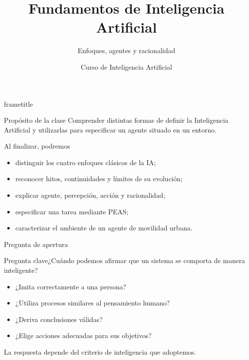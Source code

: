 \documentclass[aspectratio=169,11pt]{beamer}
\title[IA · Clase 1]{Fundamentos de Inteligencia Artificial}
\subtitle{Enfoques, agentes y racionalidad}
\author{Curso de Inteligencia Artificial}
\institute{Semana 1 · Clase 1}
\date{}
\newcommand{\pregunta}[1]{\begin{block}{Pregunta clave}#1\end{block}}
\begin{document}
\begin{frame}[plain]
  \begin{beamercolorbox}[wd=\paperwidth,ht=\paperheight,sep=2em]{frametitle}
    \vfill
    {\Huge\inserttitle\par}
    \vspace{0.5em}
    {\Large\insertsubtitle\par}
    \vspace{2em}
    {\color{white}\large\insertauthor\par}
    {\color{white}\insertinstitute\par}
    \vfill
  \end{beamercolorbox}
\end{frame}

\begin{frame}{Propósito de la clase}
  Comprender distintas formas de definir la Inteligencia Artificial y utilizarlas para especificar un agente situado en un entorno.
  \vspace{0.5em}
  \begin{block}{Al finalizar, podremos}
    \begin{itemize}
      \item distinguir los cuatro enfoques clásicos de la IA;
      \item reconocer hitos, continuidades y límites de su evolución;
      \item explicar agente, percepción, acción y racionalidad;
      \item especificar una tarea mediante PEAS;
      \item caracterizar el ambiente de un agente de movilidad urbana.
    \end{itemize}
  \end{block}
\end{frame}

\begin{frame}{Pregunta de apertura}
  \pregunta{¿Cuándo podemos afirmar que un sistema se comporta de manera inteligente?}
  \begin{itemize}
    \item ¿Imita correctamente a una persona?
    \item ¿Utiliza procesos similares al pensamiento humano?
    \item ¿Deriva conclusiones válidas?
    \item ¿Elige acciones adecuadas para sus objetivos?
  \end{itemize}
  \vfill
  \centering\alert{La respuesta depende del criterio de inteligencia que adoptemos.}
\end{frame}
\end{document}
